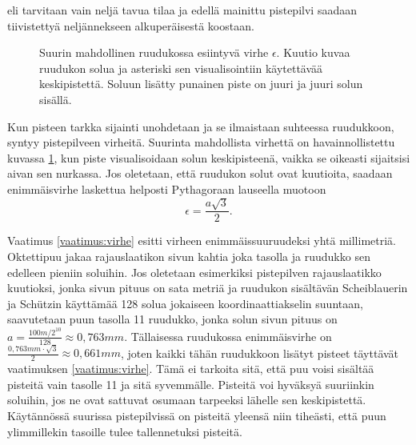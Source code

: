 
\noindent eli tarvitaan vain neljä tavua tilaa ja edellä mainittu pistepilvi saadaan tiivistettyä neljännekseen alkuperäisestä koostaan. 

\begin{figure}
    \centering
    
    \caption{Suurin mahdollinen ruudukossa esiintyvä virhe $\epsilon$. Kuutio kuvaa ruudukon solua ja asteriski sen visualisointiin käytettävää keskipistettä. Soluun lisätty punainen piste on juuri ja juuri solun sisällä.}
    \label{errorkuva}
\end{figure}

Kun pisteen tarkka sijainti unohdetaan ja se ilmaistaan suhteessa ruudukkoon, syntyy pistepilveen virheitä. Suurinta mahdollista virhettä on havainnollistettu kuvassa \ref{errorkuva}, kun piste visualisoidaan solun keskipisteenä, vaikka se oikeasti sijaitsisi aivan sen nurkassa. Jos oletetaan, että ruudukon solut ovat kuutioita, saadaan enimmäisvirhe laskettua helposti Pythagoraan lauseella muotoon 
\begin{equation}
    \epsilon = \frac{a \sqrt{3}}{2}.      
\end{equation}

Vaatimus \ref{vaatimus:virhe} esitti virheen enimmäissuuruudeksi yhtä millimetriä. Oktettipuu jakaa rajauslaatikon sivun kahtia joka tasolla ja ruudukko sen edelleen pieniin soluihin. Jos oletetaan esimerkiksi pistepilven rajauslaatikko kuutioksi, jonka sivun pituus on sata metriä ja ruudukon sisältävän Scheiblauerin ja Schützin käyttämää 128 solua jokaiseen koordinaattiakselin suuntaan, saavutetaan puun tasolla 11 ruudukko, jonka solun sivun pituus on $a = \frac{100m/2^{10}}{128} \approx 0,763mm$. Tällaisessa ruudukossa enimmäisvirhe on $\frac{0,763mm \cdot \sqrt{3}}{2} \approx 0,661mm$, joten kaikki tähän ruudukkoon lisätyt pisteet täyttävät vaatimuksen \ref{vaatimus:virhe}. Tämä ei tarkoita sitä, että puu voisi sisältää pisteitä vain tasolle 11 ja sitä syvemmälle. Pisteitä voi hyväksyä suuriinkin soluihin, jos ne ovat sattuvat osumaan tarpeeksi lähelle sen keskipistettä. Käytännössä suurissa pistepilvissä on pisteitä yleensä niin tiheästi, että puun ylimmillekin tasoille tulee tallennetuksi pisteitä.


